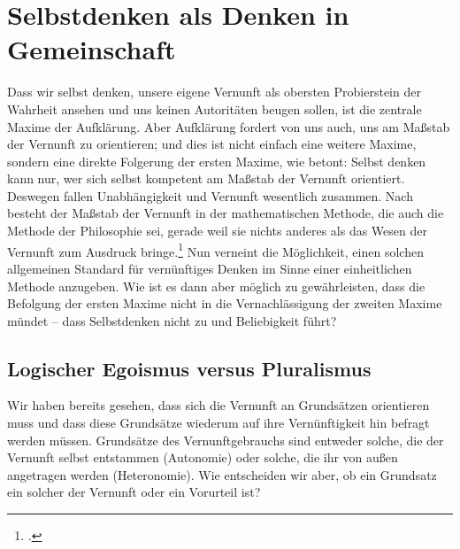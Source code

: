 \section{Selbstdenken als Denken in Gemeinschaft}\label{section:sensuscommunis}
Dass wir selbst denken, unsere eigene Vernunft als obersten Probierstein der
Wahrheit ansehen und uns keinen Autoritäten beugen sollen, ist die
zentrale Maxime der Aufklärung. Aber Aufklärung fordert von uns auch, uns am
Maßstab der Vernunft zu orientieren; und dies ist nicht einfach eine
weitere Maxime, sondern eine direkte Folgerung der ersten Maxime, wie
 betont:
Selbst denken kann nur, wer sich selbst kompetent am Maßstab der Vernunft
orientiert. Deswegen fallen Unabhängigkeit und Vernunft wesentlich zusammen.
Nach  besteht der
Maßstab der Vernunft in der mathematischen Methode, die auch die Methode der
Philosophie sei, gerade weil sie nichts anderes als das Wesen der Vernunft zum
Ausdruck
bringe.\footnote{\cite[Vgl.][\S~161]{Wolff:Discursuspraeliminarisdephilosophiaingenere1996}.}
Nun verneint  die
Möglichkeit, einen solchen allgemeinen Standard für vernünftiges Denken im Sinne
einer einheitlichen Methode anzugeben. Wie ist es dann aber möglich zu
gewährleisten, dass die Befolgung der ersten Maxime nicht in die Vernachlässigung der zweiten Maxime
mündet -- dass Selbstdenken nicht zu  und Beliebigkeit
führt?

\subsection{Logischer Egoismus versus Pluralismus}
Wir haben bereits gesehen, dass sich die Vernunft an Grundsätzen orientieren
muss und dass diese Grundsätze wiederum auf ihre Vernünftigkeit hin befragt
werden müssen. Grundsätze des Vernunftgebrauchs sind entweder solche, die der
Vernunft selbst entstammen (Autonomie) oder solche, die ihr von außen angetragen
werden (Heteronomie). Wie entscheiden wir aber, ob ein Grundsatz ein solcher der
Vernunft oder ein Vorurteil ist?

